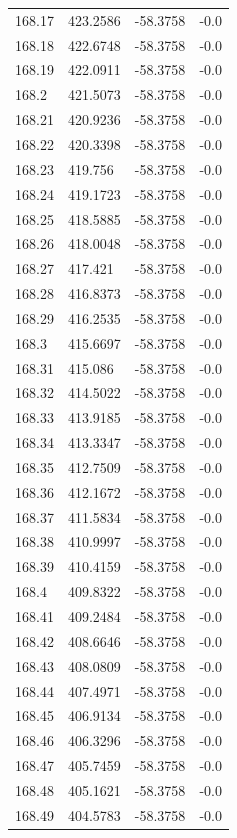 \begin{table}[H]
\begin{tabular}{llll}
168.17 & 423.2586 & -58.3758 & -0.0 \\
168.18 & 422.6748 & -58.3758 & -0.0 \\
168.19 & 422.0911 & -58.3758 & -0.0 \\
168.2 & 421.5073 & -58.3758 & -0.0 \\
168.21 & 420.9236 & -58.3758 & -0.0 \\
168.22 & 420.3398 & -58.3758 & -0.0 \\
168.23 & 419.756 & -58.3758 & -0.0 \\
168.24 & 419.1723 & -58.3758 & -0.0 \\
168.25 & 418.5885 & -58.3758 & -0.0 \\
168.26 & 418.0048 & -58.3758 & -0.0 \\
168.27 & 417.421 & -58.3758 & -0.0 \\
168.28 & 416.8373 & -58.3758 & -0.0 \\
168.29 & 416.2535 & -58.3758 & -0.0 \\
168.3 & 415.6697 & -58.3758 & -0.0 \\
168.31 & 415.086 & -58.3758 & -0.0 \\
168.32 & 414.5022 & -58.3758 & -0.0 \\
168.33 & 413.9185 & -58.3758 & -0.0 \\
168.34 & 413.3347 & -58.3758 & -0.0 \\
168.35 & 412.7509 & -58.3758 & -0.0 \\
168.36 & 412.1672 & -58.3758 & -0.0 \\
168.37 & 411.5834 & -58.3758 & -0.0 \\
168.38 & 410.9997 & -58.3758 & -0.0 \\
168.39 & 410.4159 & -58.3758 & -0.0 \\
168.4 & 409.8322 & -58.3758 & -0.0 \\
168.41 & 409.2484 & -58.3758 & -0.0 \\
168.42 & 408.6646 & -58.3758 & -0.0 \\
168.43 & 408.0809 & -58.3758 & -0.0 \\
168.44 & 407.4971 & -58.3758 & -0.0 \\
168.45 & 406.9134 & -58.3758 & -0.0 \\
168.46 & 406.3296 & -58.3758 & -0.0 \\
168.47 & 405.7459 & -58.3758 & -0.0 \\
168.48 & 405.1621 & -58.3758 & -0.0 \\
168.49 & 404.5783 & -58.3758 & -0.0 \\

\end{tabular}
\end{table}
